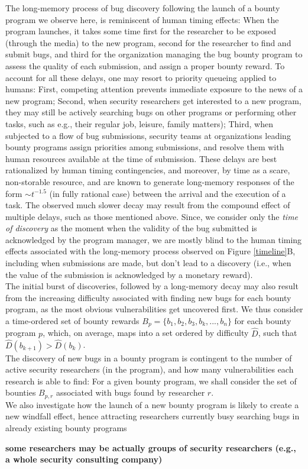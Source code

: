 The long-memory process of bug discovery following the launch of a bounty program we observe here, is reminiscent of human timing effects: When the program launches, it takes some time first for the researcher to be exposed (through the media) to the new program, second for the researcher to find and submit bugs, and third for the organization managing the bug bounty program to assess the quality of each submission, and assign a proper bounty reward. To account for all these delays, one may resort to priority queueing applied to humans: First, competing attention prevents immediate exposure to the news of a new program; Second, when security researchers get interested to a new program, they may still be actively searching bugs on other programs or performing other tasks, such as e.g., their regular job, leisure, family matters); Third, when subjected to a flow of bug submissions, security teams at organizations leading bounty programs assign priorities among submissions, and resolve them with human resources available at the time of submission. These delays are best rationalized by human timing contingencies, and moreover, by time as a scare, non-storable resource, and are known to generate long-memory responses of the form $\sim t^{-1.5}$ (in fully rational case) between the arrival and the execution of a task\cite{maillart2011quantification}. The observed much slower decay may result from the compound effect of multiple delays, such as those mentioned above. Since, we consider only the {\it time of discovery} as the moment when the validity of the bug submitted is acknowledged by the program manager, we are mostly blind to the human timing effects associated with the long-memory process observed on Figure \ref{timeline}B, including when submissions are made, but don't lead to a discovery (i.e., when the value of the submission is acknowledged by a monetary reward).\\

The initial burst of discoveries, followed by a long-memory decay may also result from the increasing difficulty associated with finding new bugs for each bounty program, as the most obvious vulnerabilities get uncovered first. We thus consider a time-ordered set of bounty rewards $B_p= \{b_1,b_2,b_3,b_k, ..., b_n\}$ for each bounty program $p$, which, on average, maps into a set ordered by difficulty $\widehat{D}$, such that $\widehat{D}(b_{k+1}) > \widehat{D}(b_{k})$.\\
 
The discovery of new bugs in a bounty program is contingent to the number of active security researchers (in the program), and how many vulnerabilities each research is able to find: For a given bounty program, we shall consider the set of bounties $B_{p,r}$ associated with bugs found by researcher $r$.\\

We also investigate how the launch of a new bounty program is likely to create a new windfall effect, hence attracting researchers currently busy searching bugs in already existing bounty programs


{\bf some researchers may be actually groups of security researchers (e.g., a whole security consulting company)}



